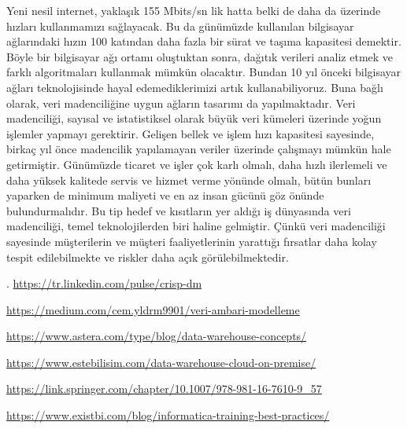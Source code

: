 \documentclass{article}
\begin{document}
Yeni nesil internet, yaklaşık 155 Mbits/sn lik hatta belki de daha da
üzerinde hızları kullanmamızı sağlayacak. Bu da günümüzde kullanılan bilgisayar
ağlarındaki hızın 100 katından daha fazla bir sürat ve taşıma kapasitesi demektir.
Böyle bir bilgisayar ağı ortamı oluştuktan sonra, dağıtık verileri analiz etmek ve
farklı algoritmaları kullanmak mümkün olacaktır. Bundan 10 yıl önceki bilgisayar
ağları teknolojisinde hayal edemediklerimizi artık kullanabiliyoruz. Buna bağlı
olarak, veri madenciliğine uygun ağların tasarımı da yapılmaktadır. Veri
madenciliği, sayısal ve istatistiksel olarak büyük veri kümeleri üzerinde yoğun
işlemler yapmayı gerektirir. Gelişen bellek ve işlem hızı kapasitesi sayesinde,
birkaç yıl önce madencilik yapılamayan veriler üzerinde çalışmayı mümkün hale
getirmiştir. Günümüzde ticaret ve işler çok karlı olmalı, daha hızlı ilerlemeli ve
daha yüksek kalitede servis ve hizmet verme yönünde olmalı, bütün bunları
yaparken de minimum maliyeti ve en az insan gücünü göz önünde
bulundurmalıdır. Bu tip hedef ve kısıtların yer aldığı iş dünyasında veri
madenciliği, temel teknolojilerden biri haline gelmiştir. Çünkü veri madenciliği sayesinde müşterilerin ve müşteri faaliyetlerinin yarattığı fırsatlar daha kolay
tespit edilebilmekte ve riskler daha açık görülebilmektedir.

\vspace{15pt}
\begin{thebibliography}
    . \href {https://tr.linkedin.com/pulse/crisp-dm}{https://tr.linkedin.com/pulse/crisp-dm}

     \href {https://medium.com/cem.yldrm9901/veri-ambari-modelleme}{https://medium.com/cem.yldrm9901/veri-ambari-modelleme}

     \href {https://www.astera.com/type/blog/data-warehouse-concepts/}{https://www.astera.com/type/blog/data-warehouse-concepts/}

     \href {https://www.estebilisim.com/data-warehouse-cloud-on-premise/}{https://www.estebilisim.com/data-warehouse-cloud-on-premise/}

     \href {https://link.springer.com/chapter/10.1007/978-981-16-7610-9_57}{https://link.springer.com/chapter/10.1007/978-981-16-7610-9_57}

     \href {https://www.existbi.com/blog/informatica-training-best-practices/}{https://www.existbi.com/blog/informatica-training-best-practices/}
    

\end{thebibliography}
\end{document}
